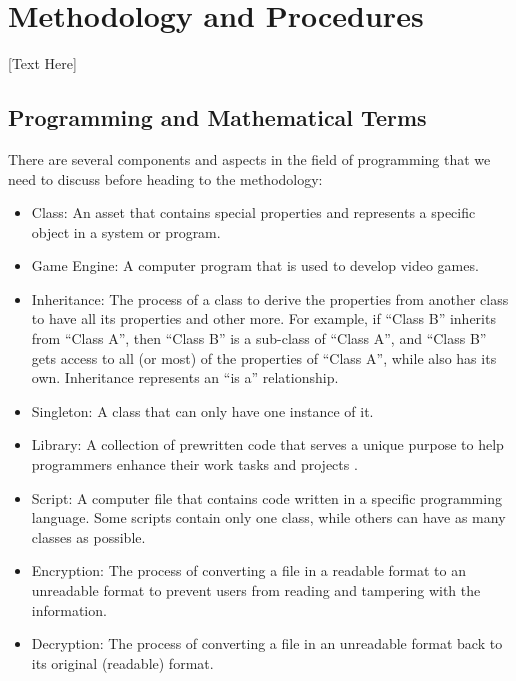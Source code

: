 
\section{Methodology and Procedures}

[Text Here]

\subsection{Programming and Mathematical Terms}
There are several components and aspects in the field of programming that we need to discuss before heading to the methodology:
\begin{itemize}
    \item {Class: An asset that contains special properties and represents a specific object in a system or program.}
    
    \item{Game Engine: A computer program that is used to develop video games.}
    
    \item{Inheritance: The process of a class to derive the properties from another class to have all its properties and other more. For example, if “Class B” inherits from “Class A”, then “Class B” is a sub-class of “Class A”, and “Class B” gets access to all (or most) of the properties of “Class A”, while also has its own. Inheritance represents an “is a” relationship.}
    
    \item{Singleton: A class that can only have one instance of it.}
    
    \item{Library: A collection of prewritten code that serves a unique purpose to help programmers enhance their work tasks and projects \cite{LibraryDef}.}
    
    \item{Script: A computer file that contains code written in a specific programming language. Some scripts contain only one class, while others can have as many classes as possible.}
    
    \item{Encryption: The process of converting a file in a readable format to an unreadable format to prevent users from reading and tampering with the information.}
    
    \item{Decryption: The process of converting a file in an unreadable format back to its original (readable) format.}
    

\end{itemize}

